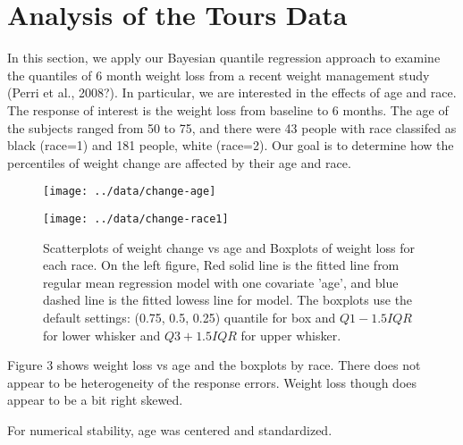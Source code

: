 \documentclass[12pt]{article}
\begin{document}
\section{Analysis of the Tours Data}
In this section, we apply our Bayesian quantile
regression approach to examine the quantiles of 6 month weight loss from a recent
weight management study (Perri et al., 2008?).  In particular, we are
interested in the effects of age and race.  
The response of interest is the  weight loss
from  baseline to  6 months. The age of
the subjects ranged from 50 to 75, and there were 43 people with race
classifed as 
black (race=1) and 181 people, white (race=2).
Our goal is to determine how  the percentiles of weight change
are affected by their age and race.

\begin{figure}[h]
  \begin{minipage}{0.5\linewidth}
    \centerline{\texttt{[image: ../data/change-age]}}
  \end{minipage}
  \begin{minipage}{0.5\linewidth}
    \centerline{\texttt{[image: ../data/change-race1]}}
  \end{minipage}

  \caption[]{\label{fig:tours} Scatterplots of weight change vs age and
    Boxplots of weight loss for each race. On the left figure, Red
    solid line is the   fitted line from regular mean regression model
    with one covariate   'age', and blue dashed line is the fitted
    lowess line for model.  The 
    boxplots use the default settings: (0.75, 0.5, 0.25) quantile for
    box and $Q1-1.5IQR$ for lower whisker and $Q3+1.5IQR$ for upper
    whisker. }
\end{figure}

Figure 3 shows  weight loss vs age and the boxplots by race.
There does not appear to be 
heterogeneity of the response errors. Weight loss though does appear
to be a bit right
skewed. 

For numerical stability, 
age was centered and standardized.
\end{document}
